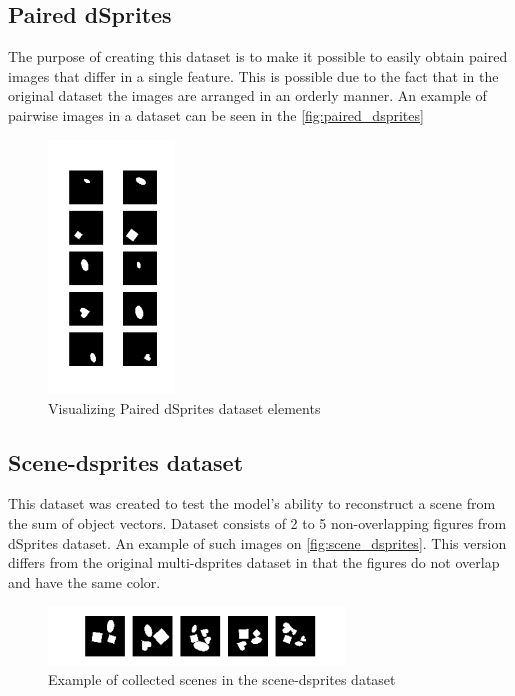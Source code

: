 \documentclass{article}
\begin{document}
    \subsection{Paired dSprites}
    The purpose of creating this dataset is to make it possible to easily
    obtain paired images that differ in a single feature. This is possible
    due to the fact that in the original dataset the images are arranged in
    an orderly manner.
    An example of pairwise images in a dataset can be seen in the
    \autoref{fig:paired_dsprites}
    \begin{figure}[ht]
        \centering
        \includegraphics[width=0.3\textwidth]{img/datasets/paired_dsprites}
        \caption{Visualizing Paired dSprites dataset elements}
        \label{fig:paired_dsprites}
    \end{figure}

    \subsection{Scene-dsprites dataset}
    This dataset was created to test the model's ability to reconstruct
    a scene from the sum of object vectors.
    Dataset consists of 2 to 5 non-overlapping figures from dSprites dataset.
    An example of such images on \autoref{fig:scene_dsprites}. This version differs from
    the original multi-dsprites dataset in that the figures do not overlap
    and have the same color.

    \begin{figure}[ht]
        \centering
        \includegraphics[width=0.7\textwidth]{img/datasets/scene-dsprites}
        \caption{Example of collected scenes in the scene-dsprites dataset}
        \label{fig:scene_dsprites}
    \end{figure}
\end{document}
